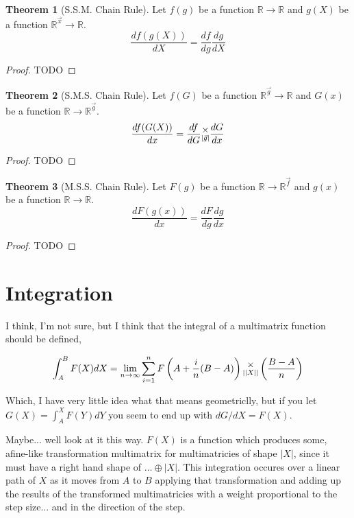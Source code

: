 \documentclass[12pt]{article}
\theoremstyle{definition}
\newtheorem{theorem}{Theorem}[section]
\theoremstyle{case}
\theoremstyle{ppart}
\newcommand{\mmult}[1]{\text{\raisebox{1ex}{$\underset{#1}{\times}$}}}
\begin{document}
\begin{theorem}[S.S.M. Chain Rule]
\label{ssm_chain_rule}
Let $f(g)$ be a function $\mathbb{R} \rightarrow \mathbb{R}$
and $g(X)$ be a function $\mathbb{R}^{\vec{x}} \rightarrow \mathbb{R}$.
\[
\frac{df(g(X))}{dX} = \frac{df}{dg} \frac{dg}{dX}
\]
\end{theorem}
\begin{proof}
TODO
\end{proof}

\begin{theorem}[S.M.S. Chain Rule]
\label{sms_chain_rule}
Let $f(G)$ be a function $\mathbb{R}^{\vec{g}} \rightarrow \mathbb{R}$
and $G(x)$ be a function $\mathbb{R} \rightarrow \mathbb{R}^{\vec{g}}$.
\[
\frac{df(G(X))}{dx} = \frac{df}{dG} \mmult{|\vec{g}|} \frac{dG}{dx}
\]
\end{theorem}
\begin{proof}
TODO
\end{proof}

\begin{theorem}[M.S.S. Chain Rule]
\label{mss_chain_rule}
Let $F(g)$ be a function $\mathbb{R} \rightarrow \mathbb{R}^{\vec{f}}$
and $g(x)$ be a function $\mathbb{R} \rightarrow \mathbb{R}$.
\[
\frac{dF(g(x))}{dx} = \frac{dF}{dg} \frac{dg}{dx}
\]
\end{theorem}
\begin{proof}
TODO
\end{proof}

\section{Integration}

I think, I'm not sure, but I think that the integral of a multimatrix function should
be defined,

\[
 \int_A^B F(X) dX = \lim_{n \to \infty}
 \sum_{i=1}^n
  F\left(A+\frac{i}{n}(B-A)\right)
  \mmult{||X||}
  \left(\frac{B-A}{n}\right)
\]

Which, I have very little idea what that means geometriclly, but
if you let $G(X) = \int_A^X F(Y) dY$ you seem to end up with $dG/dX = F(X)$.

Maybe... well look at it this way. $F(X)$ is a function which produces some,
afine-like transformation multimatrix for multimatricies of shape $|X|$,
since it must have a right hand shape of $\ldots \oplus |X|$. This integration
occures over a linear path of $X$ as it moves from $A$ to $B$ applying that
transformation and adding up the results of the transformed multimatricies with
a weight proportional to the step size... and in the direction of the step.
\end{document}

